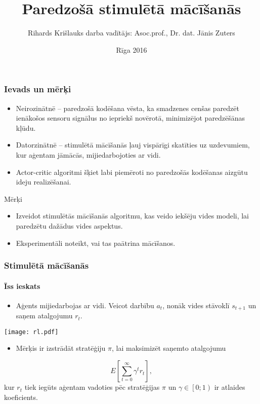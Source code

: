 \documentclass[xetex,mathserif]{beamer}
\title{Paredzošā stimulētā mācīšanās}
\author{Rihards Krišlauks \newline \small{darba vadītājs: Asoc.prof., Dr. dat. Jānis Zuters}}
\date{Rīga 2016}
\begin{document}
  \frame{\titlepage}
  \begin{frame}
    \frametitle{Ievads un mērķi}
    \begin{itemize} 
    \item Neirozinātnē -- paredzošā kodēšana vēsta, ka smadzenes cenšas
      paredzēt ienākošos sensoru signālus no iepriekš novērotā, minimizējot
      paredzēšānas kļūdu.
    \item Datorzinātnē -- stimulētā mācīšanās ļauj vispārīgi skatīties uz
      uzdevumiem, kur aģentam jāmācās, mijiedarbojoties ar vidi. 
    \item Actor-critic algoritmi šķiet labi piemēroti no paredzošās kodēšanas
      aizgūtu ideju realizēšanai.
    \end{itemize}
    \vspace{0.5cm}
    Mērķi
    \begin{itemize} 
    \item Izveidot stimulētās mācīšanās algoritmu, kas veido iekšēju vides
      modeli, lai paredzētu dažādus vides aspektus.
    \item Eksperimentāli noteikt, vai tas paātrina mācīšanos.
    \end{itemize}
  \end{frame}


  \begin{frame}
    \frametitle{Stimulētā mācīšanās}
    \framesubtitle{Īss ieskats}
    \begin{itemize}
      \item Aģents mijiedarbojas ar vidi. Veicot darbību $a_t$, nonāk vides
        stāvoklī $s_{t+1}$ un saņem atalgojumu $r_{t}$.
    \end{itemize}
    \begin{center}
      \texttt{[image: rl.pdf]}
    \end{center}
    \begin{itemize}
      \item Mērķis ir izstrādāt stratēģiju $\pi$, lai maksimizēt saņemto atalgojumu
    \end{itemize}
    \[
      E\left[\sum_{t=0}^{\infty}\gamma^t r_t\right],
    \]
    kur $r_t$ tiek iegūts aģentam vadoties pēc stratēģijas $\pi$ un $\gamma \in
    \left[0; 1\right)$ ir atlaides koeficients.
    
  \end{frame}
  
\end{document}
